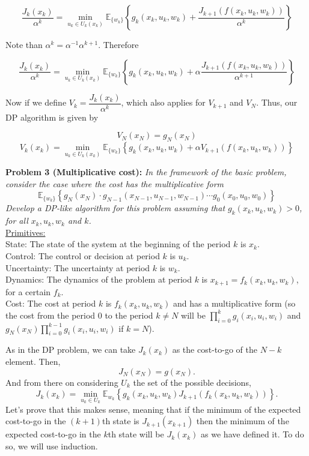 \documentclass[11pt, english]{article}
\begin{document}
$$ \dfrac{J_k(x_k)}{\alpha^k} = \min_{u_k \in U_k(x_k)}\mathbb{E}_{\{w_k\}}\left\{g_k\left(x_k,u_k,w_k\right) + \dfrac{J_{k + 1} \left(f\left(x_k,u_k,w_k\right)\right)}{\alpha^k}  \right\}$$

Note than $\alpha^k = \alpha^{-1} \alpha^{k+1}$. Therefore

$$ \dfrac{J_k(x_k)}{\alpha^k} = \min_{u_k \in U_k(x_k)}\mathbb{E}_{\{w_k\}}\left\{g_k\left(x_k,u_k,w_k\right) + \alpha \dfrac{J_{k + 1} \left(f\left(x_k,u_k,w_k\right)\right)}{\alpha^{k+1}}  \right\}$$

Now if we define $V_k = \dfrac{J_k(x_k)}{\alpha^k}$, which also applies for $V_{k+1}$ and $V_N$. Thus, our DP algorithm is given by

$$V_N (x_N) = g_N (x_N)$$
$$V_k(x_k) = \min_{u_k \in U_k(x_k)}\mathbb{E}_{\{w_k\}}\left\{g_k\left(x_k,u_k,w_k\right) + \alpha V_{k + 1} \left(f\left(x_k,u_k,w_k\right)\right) \right\}$$



\textbf{Problem 3 (Multiplicative cost):}\textit{ In the framework of the basic problem, consider the case where the cost has the multiplicative form}
$$\mathbb{E}_{\{w_k\}}\left\{g_N(x_N)\cdot g_{N-1}(x_{N-1},u_{N-1},w_{N-1})\cdots g_0(x_0,u_0,w_0) \right\}$$
\textit{Develop a DP-like algorithm for this problem assuming that $g_k(x_k,u_k,w_k)>0$, for all $x_k,u_k,w_k$ and $k$.}\\
\underline{Primitives:}\\
State: The state of the system at the beginning of the period $k$ is $x_k$.\\
Control: The control or decision at period $k$ is $u_k$.\\
Uncertainty: The uncertainty at period $k$ is $w_k$.\\
Dynamics: The dynamics of the problem at period $k$ is $x_{k+1}=f_k(x_k,u_k,w_k)$, for a certain $f_k$.\\
Cost: The cost at period $k$ is $f_k(x_k,u_k,w_k)$ and has a multiplicative form (so the cost from the period 0 to the period $k\neq N$ will be $\prod\limits_{i=0}^k g_i(x_i,u_i,w_i)$ and $g_N(x_N)\prod\limits_{i=0}^{k-1} g_i(x_i,u_i,w_i)$ if $k=N$).
 
As in the DP problem, we can take $J_k(x_k)$ as the cost-to-go of the $N-k$ element. Then, 
$$J_N(x_N)=g(x_N).$$
And from there on considering $U_k$ the set of the possible decisions,
$$J_{k}(x_k)=\underset{u_k\in U_k}{\min}\mathbb{E}_{w_k}\left\{g_k(x_k,u_k,w_k)J_{k+1}(f_k(x_k,u_k,w_k))\right\}.$$
Let's prove that this makes sense, meaning that if the minimum of the expected cost-to-go in the $(k+1)$th state is $J_{k+1}(x_{k+1})$ then the minimum of the expected cost-to-go in the $k$th state will be $J_k(x_k)$ as we have defined it. To do so, we will use induction. \\
\end{document}
